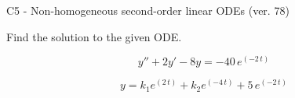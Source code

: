 \begin{exercise}
  \begin{exerciseTitle}C5 - Non-homogeneous second-order linear ODEs (ver. 78)\end{exerciseTitle}
  \begin{exerciseStatement}
    
Find the solution to the given ODE.

    
\[y''+2y'-8y = -40 \, e^{\left(-2 \, t\right)}\]

  \end{exerciseStatement}
  \begin{exerciseAnswer}
    
\[y= k_{1} e^{\left(2 \, t\right)} + k_{2} e^{\left(-4 \, t\right)} + 5 \, e^{\left(-2 \, t\right)}\]

  \end{exerciseAnswer}
\end{exercise}